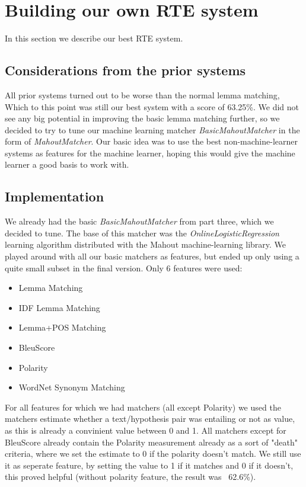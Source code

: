\section{Building our own RTE system}
In this section we describe our best RTE system.

\subsection{Considerations from the prior systems}
All prior systems turned out to be worse than the normal lemma matching, Which to this point was still our  best system
with a score of 63.25\%. We did not see any big potential in improving the basic lemma matching further, so we decided
to try to tune our machine learning matcher \textit{BasicMahoutMatcher} in the form of \textit{MahoutMatcher}. Our basic
idea was to use the best non-machine-learner systems as features for the machine learner, hoping this would give the
machine learner a good basis to work with.

\subsection{Implementation}
We already had the basic \textit{BasicMahoutMatcher} from part three, which we decided to tune. The base of this matcher
was the \textit{OnlineLogisticRegression} learning algorithm distributed with the Mahout machine-learning library. We
played around with all our basic matchers as features, but ended up only using a quite small subset in the final
version. Only 6 features were used:
\begin{itemize}
    \item Lemma Matching
    \item IDF Lemma Matching
    \item Lemma+POS Matching
    \item BleuScore
    \item Polarity
    \item WordNet Synonym Matching
\end{itemize}

For all features for which we had matchers (all except Polarity) we used the matchers estimate whether a text/hypothesis
pair was entailing or not as value, as this is already a convinient value between 0 and 1. All matchers except for
BleuScore already contain the Polarity measurement already as a sort of "death" criteria, where we set the estimate to
0 if the polarity doesn't match. We still use it as seperate feature, by setting the value to 1 if it matches and 0 if
it doesn't, this proved helpful (without polarity feature, the result was ~62.6\%).

